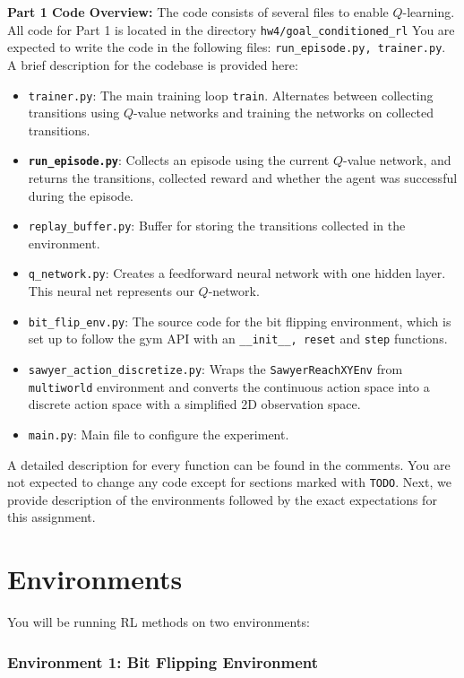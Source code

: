 \documentclass[12pt]{article}
\begin{document}
\textbf{Part 1 Code Overview:} The code consists of several files to enable $Q$-learning. All code for Part 1 is located in the directory \texttt{hw4/goal\_conditioned\_rl} You are expected to write the code in the following files: \texttt{run\_episode.py, trainer.py}. A brief description for the codebase is provided here:
\begin{itemize}
    \item \texttt{trainer.py}: The main training loop \texttt{train}. Alternates between collecting transitions using $Q$-value networks and training the networks on collected transitions.
    \item \textbf{\texttt{run\_episode.py}}: Collects an episode using the current $Q$-value network, and returns the transitions, collected reward and whether the agent was successful during the episode.
    \item \texttt{replay\_buffer.py}: Buffer for storing the transitions collected in the environment.
    \item \texttt{q\_network.py}: Creates a feedforward neural network with one hidden layer. This neural net represents our $Q$-network.
    \item\texttt{bit\_flip\_env.py}: The source code for the bit flipping environment, which is set up to follow the gym API with an \texttt{\_\_init\_\_, reset} and \texttt{step} functions.
    \item\texttt{sawyer\_action\_discretize.py}: Wraps the \texttt{SawyerReachXYEnv} from \texttt{multiworld} environment and converts the continuous action space into a discrete action space with a simplified 2D observation space.
    \item \texttt{main.py}: Main file to configure the experiment.
\end{itemize}

A detailed description for every function can be found in the comments. You are not expected to change any code except for sections marked with \texttt{TODO}. Next, we provide description of the environments followed by the exact expectations for this assignment.

\section*{Environments}
You will be running RL methods on two environments:

\subsubsection*{Environment 1: Bit Flipping Environment}
\end{document}

